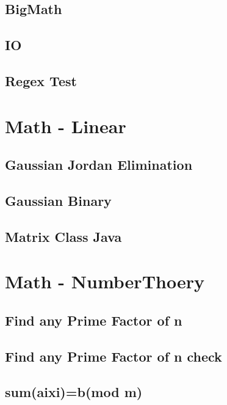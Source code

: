 \subsection{BigMath}
\raggedbottom
\hrulefill
\subsection{IO}
\raggedbottom
\hrulefill
\subsection{Regex Test}
\raggedbottom
\hrulefill

\section{Math - Linear}
\subsection{Gaussian Jordan Elimination}
\raggedbottom
\hrulefill
\subsection{Gaussian Binary}
\raggedbottom
\hrulefill
\subsection{Matrix Class Java}
\raggedbottom
\hrulefill

\section{Math - NumberThoery}
\subsection{Find any Prime Factor of n}
\raggedbottom
\hrulefill
\subsection{Find any Prime Factor of n check}
\raggedbottom
\hrulefill
\subsection{sum(aixi)=b(mod m)}
\raggedbottom
\hrulefill
